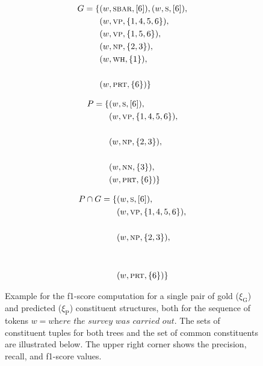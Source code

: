 \documentclass[../document.tex]{subfiles}
\begin{document}
\begin{figure}
        \begin{minipage}{.35\linewidth}
            \small
            \begin{align*}
                G = \{
                &(w, \textsc{sbar}, [6]),
                (w, \textsc{s}, [6]), \\
                &(w, \textsc{vp}, \{1,4,5,6\}),\\
                &(w, \textsc{vp}, \{1,5,6\}), \\
                &(w, \textsc{np}, \{2,3\}), \\
                &(w, \textsc{wh}, \{1\}), \\ \\
                &(w, \textsc{prt}, \{6\}) \}
            \end{align*}
        \end{minipage}
        \hfill
        \begin{minipage}{.3\linewidth}
            \small
            \begin{align*}
                P = \{
                &(w, \textsc{s}, [6]), \\
                &(w, \textsc{vp}, \{1,4,5,6\}),\\ \\
                &(w, \textsc{np}, \{2,3\}),\\ \\
                &(w, \textsc{nn}, \{3\}), \\
                &(w, \textsc{prt}, \{6\}) \}
            \end{align*}
        \end{minipage}
        \hfill
        \begin{minipage}{.3\linewidth}
            \small
            \begin{align*}
                P \cap G = \{
                &(w, \textsc{s}, [6]), \\
                &(w, \textsc{vp}, \{1,4,5,6\}),\\ \\
                &(w, \textsc{np}, \{2,3\}), \\ \\ \\
                &(w, \textsc{prt}, \{6\}) \}
            \end{align*}
        \end{minipage}

        \caption{
            Example for the f1-score computation for a single pair of gold (\(\xi_\text{G}\)) and predicted (\(\xi_\text{P}\)) constituent structures, both for the sequence of tokens \(w = \textit{where the survey was carried out}\).
            The sets of constituent tuples for both trees and the set of common constituents are illustrated below.
            The upper right corner shows the precision, recall, and f1-score values.
        }
    \end{figure}
\end{document}
